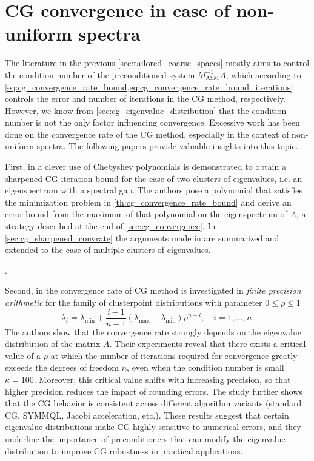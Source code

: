 \section{CG convergence in case of non-uniform spectra}\label{sec:cg_nonuniform_spectra}
The literature in the previous \cref{sec:tailored_coarse_spaces} mostly aims to control the condition number of the preconditioned system $M_{\text{ASM}}^{-1}A$, which according to \cref{eq:cg_convergence_rate_bound,eq:cg_convergence_rate_bound_iterations} controls the error and number of iterations in the CG method, respectively. However, we know from \cref{sec:cg_eigenvalue_distribution} that the condition number is not the only factor influencing convergence. Excessive work has been done on the convergence rate of the CG method, especially in the context of non-uniform spectra. The following papers provide valuable insights into this topic.


First, in \cite{cg_sharpened_convrate_Axelsson1976} a clever use of Chebyshev polynomials is demonstrated to obtain a sharpened CG iteration bound for the case of two clusters of eigenvalues, i.e. an eigenspectrum with a spectral gap. The authors pose a polynomial that satisfies the minimization problem in \cref{th:cg_convergence_rate_bound} and derive an error bound from the maximum of that polynomial on the eigenspectrum of $A$, a strategy described at the end of \cref{sec:cg_convergence}. In \cref{sec:cg_sharpened_convrate} the arguments made in \cite{cg_sharpened_convrate_Axelsson1976} are summarized and extended to the case of multiple clusters of eigenvalues. 

.

Second, in \cite{cg_convrate_Strakos1991} the convergence rate of CG method is investigated in \textit{finite precision arithmetic} for the family of clusterpoint distributions with parameter $0 \leq \rho \leq 1$
\[
    \lambda_i = \lambda_{\text{min}} + \frac{i-1}{n-1}(\lambda_{\text{max}} - \lambda_{\text{min}})\rho^{n-i}, \quad i=1,\ldots,n.
\]
The authors show that the convergence rate strongly depends on the eigenvalue distribution of the matrix $A$. Their experiments reveal that there exists a critical value of a $\rho$ at which the number of iterations required for convergence greatly exceeds the degrees of freedom $n$, even when the condition number is small $\kappa=100$. Moreover, this critical value shifts with increasing precision, so that higher precision reduces the impact of rounding errors. The study further shows that the CG behavior is consistent across different algorithm variants (standard CG, SYMMQL, Jacobi acceleration, etc.). These results suggest that certain eigenvalue distributions make CG highly sensitive to numerical errors, and they underline the importance of preconditioners that can modify the eigenvalue distribution to improve CG robustness in practical applications.

